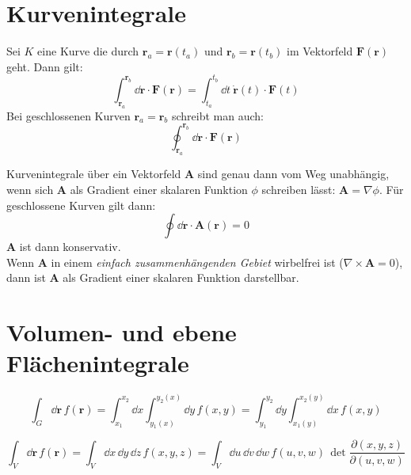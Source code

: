 \section{Kurvenintegrale}

\begin{framedprop}
Sei $K$ eine Kurve die durch $\mathbf{r}_a = \mathbf{r}(t_a)$ und $\mathbf{r}_b = \mathbf{r}(t_b)$ im Vektorfeld $\mathbf{F}(\mathbf{r})$ geht. Dann gilt:
\[
\int_{\mathbf{r}_a}^{\mathbf{r}_b} \dd \mathbf{r} \cdot \mathbf{F}(\mathbf{r}) = \int_{t_a}^{t_b} \dd t \  \dot{\mathbf{r}}(t) \cdot \mathbf{F}(t)
\]
Bei geschlossenen Kurven $\mathbf{r}_a = \mathbf{r}_b$ schreibt man auch:
\[
\oint_{\mathbf{r}_a}^{\mathbf{r}_b} \dd \mathbf{r} \cdot \mathbf{F}(\mathbf{r})
\]
\end{framedprop}

\begin{framedthm}
Kurvenintegrale über ein Vektorfeld $\mathbf{A}$ sind genau dann vom Weg unabhängig, wenn sich $\mathbf{A}$ als Gradient einer skalaren Funktion $\phi$ schreiben lässt: $\mathbf{A} = \nabla \phi$. Für geschlossene Kurven gilt dann: 
\[
\oint \dd \mathbf{r} \cdot \mathbf{A}(\mathbf{r}) = 0
\]
$\mathbf{A}$ ist dann konservativ.\\
Wenn $\mathbf{A}$ in einem \textit{einfach zusammenhängenden Gebiet} wirbelfrei ist ($\nabla \times \mathbf{A} = 0$), dann ist $\mathbf{A}$ als Gradient einer skalaren Funktion darstellbar.
\end{framedthm}

\section{Volumen- und ebene Flächenintegrale}

\begin{framedprop}
\[
\int_{G} \dd\mathbf{r} \, f(\mathbf{r}) = \int_{x_{1}}^{x_{2}} \dd x \int_{y_{1}(x)}^{y_{2}(x)} \dd y \, f(x,y) = \int_{y_{1}}^{y_{2}} \dd y \int_{x_{1}(y)}^{x_{2}(y)} \dd x \, f(x,y)
\]
\end{framedprop}

\begin{framedprop}
\[
\int_{V} \dd \mathbf{r} \, f(\mathbf{r}) = \int_{V} \dd x \, \dd y \, \dd z \, f(x,y,z) = \int_{V} \dd u \, \dd v \, \dd w \, f(u,v,w) \, \det\frac{\partial(x,y,z)}{\partial(u,v,w)}
\]
\end{framedprop}


